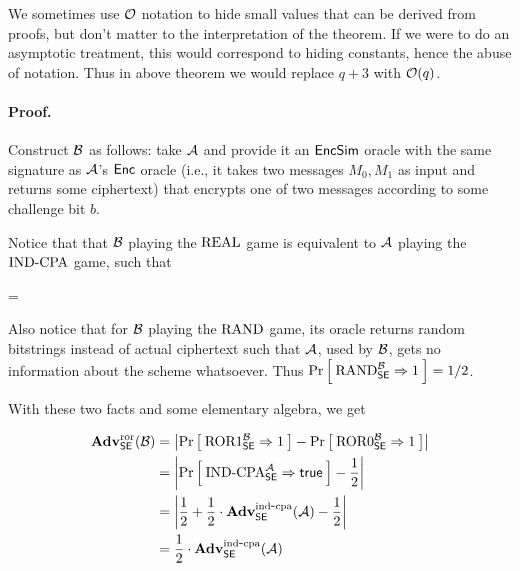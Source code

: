 We sometimes use ${\cal O}$ notation to hide small values that can be derived from
proofs, but don't matter to the interpretation of the theorem. If we were to do
an asymptotic treatment, this would correspond to hiding constants, hence the
abuse of notation.  Thus in above theorem we would replace $q+3$ with
${\cal O}(q)$. 

\paragraph{Proof.}

Construct ${\mathcal B}$ as follows: take ${\mathcal A}$ and provide it an $\textsf{EncSim}$
oracle with the same signature as ${\mathcal A}$'s $\textsf{Enc}$ oracle (i.e., it takes two
messages $M_0, M_1$ as input and returns some ciphertext) that encrypts one
of two messages according to some challenge bit $b$.


Notice that that ${\mathcal B}$ playing the $\textnormal{REAL}$ game is equivalent to 
${\mathcal A}$ playing the $\textnormal{IND-CPA}$ game, such that

\bnm
{} =
\Prob{\INDCPA_{\SEscheme}^{\advA} \Rightarrow \true}
\enm

Also notice that for ${\mathcal B}$ playing the $\textnormal{RAND}$ game, its oracle returns
random bitstrings instead of actual ciphertext such that ${\mathcal A}$, used by
${\mathcal B}$, gets no information about the scheme whatsoever.  Thus
$\Pr\left[\: \textnormal{RAND}_{\textnormal{\textsf{SE}}}^{{\mathcal B}} \Rightarrow 1 \:\right] = 1/2$.

With these two facts and some elementary algebra, we get

\begin{align*}
\mathbf{Adv}^{\mathrm{ror}}_{{\mathsf{SE}}}({\mathcal B}) 
    &= \left|\Pr\left[\: \textnormal{ROR}1_{\mathsf{SE}}^{\mathcal B}\Rightarrow 1 \:\right] -
                                \Pr\left[\: \textnormal{ROR}0_{\mathsf{SE}}^{\mathcal B}\Rightarrow 1 \:\right]\right|\\
    &= \left|\Pr\left[\: \textnormal{IND-CPA}_{\mathsf{SE}}^{\mathcal A}\Rightarrow\mathsf{true} \:\right] - \frac{1}{2}\right|\\
    &= \left|\frac{1}{2} +
    \frac{1}{2}\cdot\mathbf{Adv}^{\mathrm{ind\mbox{-} cpa}}_{{\mathsf{SE}}}({\mathcal A}) - \frac{1}{2}\right|\\
    &= \frac{1}{2}\cdot\mathbf{Adv}^{\mathrm{ind\mbox{-} cpa}}_{{\mathsf{SE}}}({\mathcal A})
\end{align*}


